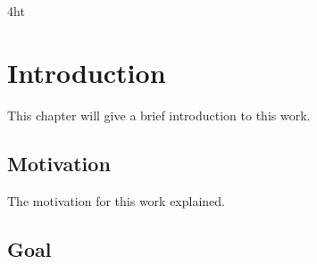 \documentclass[
a4paper,
twoside,
bibliography=totoc,
headsepline,
cleardoublepage=empty,
parskip=half,
draft=false
]{scrbook}
\begin{document}
	
	\listoffigures
	\listoftables
	
	
	
	\printnoidxglossaries
	
	\iftex4ht
	\else
	\fi
	
	
	\renewcommand*{\chapterpagestyle}{scrplain}
	\pagestyle{scrheadings}
	\pagestyle{scrheadings}
	\ihead[]{}
	\chead[]{}
	\ohead[]{\headmark}
	\cfoot[]{}
	\ifoot[]{}

	
	\chapter{Introduction} \label{ch:introduction}
	
		This chapter will give a brief introduction to this work.
		
		\section{Motivation} \label{sec:motivation}
		
			The motivation for this work explained.
			
		\section{Goal} \label{sec:goal}
		
\end{document}
